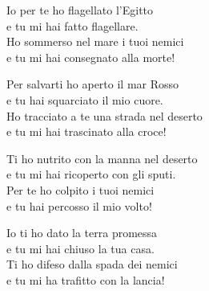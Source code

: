 

\spazio

\strofa Io per te ho flagellato l'Egitto\\
e tu mi hai fatto flagellare.\\
Ho sommerso nel mare i tuoi nemici\\
e tu mi hai consegnato alla morte!

\spazio


\spazio

\strofa Per salvarti ho aperto il mar Rosso\\
e tu hai squarciato il mio cuore.\\
Ho tracciato a te una strada nel deserto\\
e tu mi hai trascinato alla croce!

\spazio


\spazio

\strofa Ti ho nutrito con la manna nel deserto\\
e tu mi hai ricoperto con gli sputi.\\
Per te ho colpito i tuoi nemici\\
e tu hai percosso il mio volto!

\spazio


\spazio

\strofa Io ti ho dato la terra promessa\\
e tu mi hai chiuso la tua casa.\\
Ti ho difeso dalla spada dei nemici\\
e tu mi ha trafitto con la lancia!

\spazio

